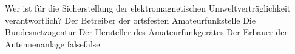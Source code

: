     {Wer ist für die Sicherstellung der elektromagnetischen Umweltverträglichkeit verantwortlich?}
    {Der Betreiber der ortsfesten Amateurfunkstelle}
    {Die Bundesnetzagentur}
    {Der Hersteller des Amateurfunkgerätes}
    {Der Erbauer der Antennenanlage}
    {false}{false}